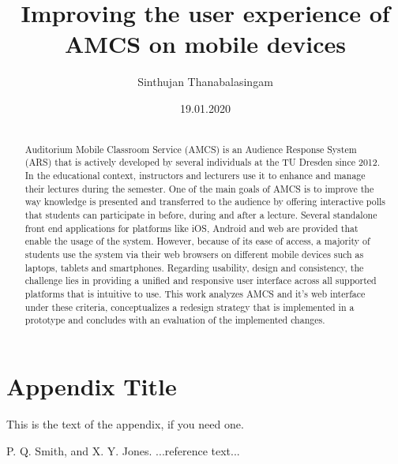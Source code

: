 \documentclass[ngerman]{tudscrreprt}
\begin{document}
	\date{19.01.2020}
	\author{Sinthujan Thanabalasingam}
	\title{Improving the user experience of AMCS on mobile devices}
	\maketitle
	
\begin{abstract}
\section*{\abstractname}
Auditorium Mobile Classroom Service (AMCS) is an Audience Response System (ARS) that is actively developed by several individuals at the TU Dresden since 2012. In the educational context, instructors and lecturers use it to enhance and manage their lectures during the semester. One of the main goals of AMCS is to improve the way knowledge is presented and transferred to the audience by offering interactive polls that students can participate in before, during and after a lecture.
Several standalone front end applications for platforms like iOS, Android and web are provided that enable the usage of the system. However, because of its ease of access, a majority of students use the system via their web browsers on different mobile devices such as laptops, tablets and smartphones. 
Regarding usability, design and consistency, the challenge lies in providing a unified and responsive user interface across all supported platforms that is intuitive to use. This work analyzes AMCS and it's web interface under these criteria, conceptualizes a redesign strategy that is implemented in a prototype and concludes with an evaluation of the implemented changes.
	
\end{abstract}

\cleardoublepage


\tableofcontents








\appendix
\section{Appendix Title}

This is the text of the appendix, if you need one.






\begin{thebibliography}{}
	
	P. Q. Smith, and X. Y. Jones. ...reference text...
	
\end{thebibliography}
\end{document}
